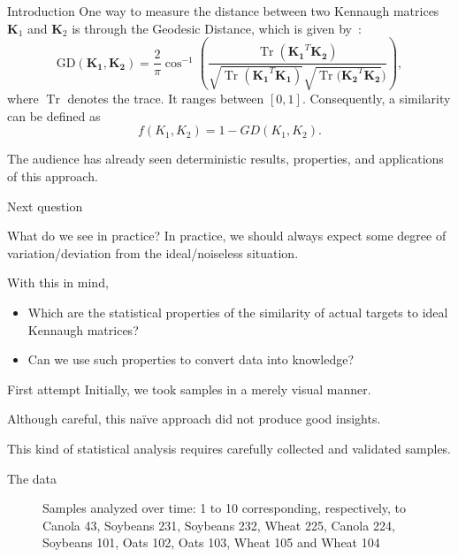 \documentclass[10pt]{beamer}
\newcommand{\Tr}{\operatorname{Tr}}
\begin{document}
\begin{frame}[fragile]{Introduction}
    One way to measure the distance between two Kennaugh matrices $\bm K_1$ and $\bm K_2$ is through the Geodesic Distance, which is given by~\cite{ClassificationPolSARGeodesic}: 
    \begin{displaymath}
    \text{GD}(\mathbf{K_1}, \mathbf{K_2}) = \frac{2}{\pi} \cos^{-1} \left(\frac{\Tr(\mathbf{K_1}^T \mathbf{K_2})}{\sqrt{\Tr(\mathbf{K_1}^T \mathbf{K_1})} \sqrt{\Tr(\mathbf{K_2}^T \mathbf{K_2}})} \right),
    \end{displaymath}
    where $\Tr$ denotes the trace. It ranges between $[0,1]$. 
    Consequently, a similarity can be defined as 
    $$
    f(K_1, K_2) = 1 - GD(K_1, K_2).$$
    
    The audience has already seen \alert{deterministic} results, properties, and applications of this approach.
\end{frame}

\begin{frame}{Next question}

\begin{alertblock}{What do we see in practice?}
In practice, we should always expect some degree of variation/deviation from the ideal/noiseless situation.

With this in mind,
\begin{itemize}
	\item Which are the statistical properties of the similarity of actual targets to ideal Kennaugh matrices?
	\item Can we use such properties to convert data into knowledge?
\end{itemize}
\end{alertblock}
\end{frame}

\begin{frame}{First attempt}
Initially, we took samples in a merely visual manner.

Although careful, this na\"ive approach did not produce good insights.

This kind of statistical analysis requires carefully collected and validated samples.
\end{frame}

\begin{frame}{The data}
	\begin{figure}[hbt]
		\centering
		\caption{Samples analyzed over time: 1 to 10 corresponding, respectively, to Canola 43, Soybeans 231, Soybeans 232, Wheat 225, Canola 224, Soybeans 101, Oats 102, Oats 103, Wheat 105 and Wheat 104}
	\end{figure}
\end{frame}
\end{document}
